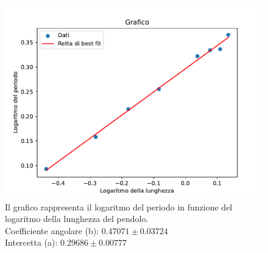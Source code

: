 \documentclass[11pt]{article}
\begin{document}
\begin{figure}[H]
  \centering
  \includegraphics[width=1\textwidth]{grafico3p2.pdf}
  \caption{Il grafico rappresenta il logaritmo del periodo in funzione del logaritmo della lunghezza del pendolo. \\
  Coefficiente angolare (b): $0.47071\pm 0.03724$ \\
  Intercetta (a): $0.29686\pm 0.00777$}
\end{figure}
\end{document}
